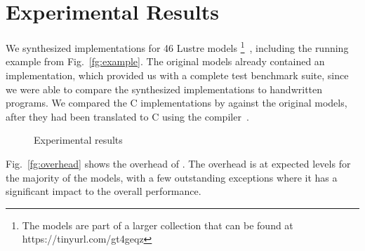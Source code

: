\section{Experimental Results}
\label{sec:experiment}

We synthesized implementations for 46 Lustre models%
\footnote{The models are part of a larger collection
that can be found at
https://tinyurl.com/gt4geqz}~\cite{Hagen08:FMCAD}, including the running example from Fig.~\ref{fg:example}.
 The original models already contained an implementation,
which provided us with a complete test benchmark suite, since we were able to
compare the synthesized implementations to handwritten programs.
We compared the C implementations by \jkindsynt against the original models, after they had been translated
to C using the \lustrev compiler~\cite{lustrev6}.



\begin{figure}[h!]
	\centering
	\hspace{5mm}
	\hfill
	\caption{Experimental results}
	\label{fig:expfigs} 
\end{figure}

Fig.~\ref{fg:overhead} shows the overhead of \jkindsynt. The overhead is at
expected levels for the majority of the models, with a few outstanding
exceptions where it has a significant impact to the overall performance.



